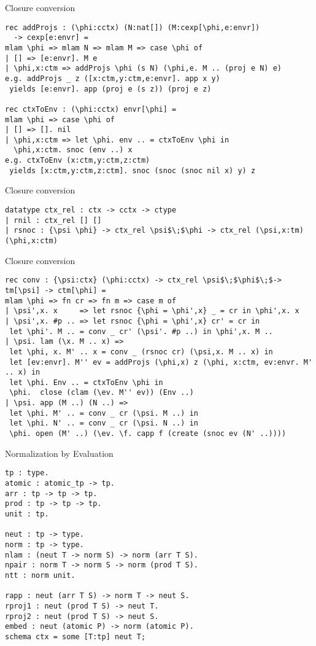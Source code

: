 \documentclass{beamer}
\begin{document}
\begin{frame}[fragile]{Closure conversion}

\begin{lstlisting}
rec addProjs : (\phi:cctx) (N:nat[]) (M:cexp[\phi,e:envr])
  -> cexp[e:envr] =
mlam \phi => mlam N => mlam M => case \phi of
| [] => [e:envr]. M e
| \phi,x:ctm => addProjs \phi (s N) (\phi,e. M .. (proj e N) e)
e.g. addProjs _ z ([x:ctm,y:ctm,e:envr]. app x y)
 yields [e:envr]. app (proj e (s z)) (proj e z)

rec ctxToEnv : (\phi:cctx) envr[\phi] =
mlam \phi => case \phi of
| [] => []. nil
| \phi,x:ctm => let \phi. env .. = ctxToEnv \phi in
  \phi,x:ctm. snoc (env ..) x
e.g. ctxToEnv (x:ctm,y:ctm,z:ctm)
 yields [x:ctm,y:ctm,z:ctm]. snoc (snoc (snoc nil x) y) z

\end{lstlisting}
\end{frame}

\begin{frame}[fragile]{Closure conversion}
\begin{lstlisting}
datatype ctx_rel : ctx -> cctx -> ctype
| rnil : ctx_rel [] []
| rsnoc : {\psi \phi} -> ctx_rel \psi$\;$\phi -> ctx_rel (\psi,x:tm) (\phi,x:ctm)
\end{lstlisting}
\end{frame}
\begin{frame}[fragile]{Closure conversion}
\begin{lstlisting}
rec conv : {\psi:ctx} (\phi:cctx) -> ctx_rel \psi$\;$\phi$\;$-> tm[\psi] -> ctm[\phi] =
mlam \phi => fn cr => fn m => case m of
| \psi',x. x     => let rsnoc {\phi = \phi',x} _ = cr in \phi',x. x
| \psi',x. #p .. => let rsnoc {\phi = \phi',x} cr' = cr in 
 let \phi'. M .. = conv _ cr' (\psi'. #p ..) in \phi',x. M ..
| \psi. lam (\x. M .. x) =>
 let \phi, x. M' .. x = conv _ (rsnoc cr) (\psi,x. M .. x) in
 let [ev:envr]. M'' ev = addProjs (\phi,x) z (\phi, x:ctm, ev:envr. M' .. x) in
 let \phi. Env .. = ctxToEnv \phi in 
 \phi.  close (clam (\ev. M'' ev)) (Env ..)
| \psi. app (M ..) (N ..) =>
 let \phi. M' .. = conv _ cr (\psi. M ..) in
 let \phi. N' .. = conv _ cr (\psi. N ..) in
 \phi. open (M' ..) (\ev. \f. capp f (create (snoc ev (N' ..))))
\end{lstlisting}
\end{frame}

\begin{frame}[fragile]{Normalization by Evaluation}
\begin{lstlisting}
tp : type.
atomic : atomic_tp -> tp.
arr : tp -> tp -> tp.
prod : tp -> tp -> tp.
unit : tp.

neut : tp -> type.
norm : tp -> type.
nlam : (neut T -> norm S) -> norm (arr T S).
npair : norm T -> norm S -> norm (prod T S).
ntt : norm unit.

rapp : neut (arr T S) -> norm T -> neut S.
rproj1 : neut (prod T S) -> neut T.
rproj2 : neut (prod T S) -> neut S.
embed : neut (atomic P) -> norm (atomic P).
schema ctx = some [T:tp] neut T;
\end{lstlisting}
\end{frame}
\end{document}
